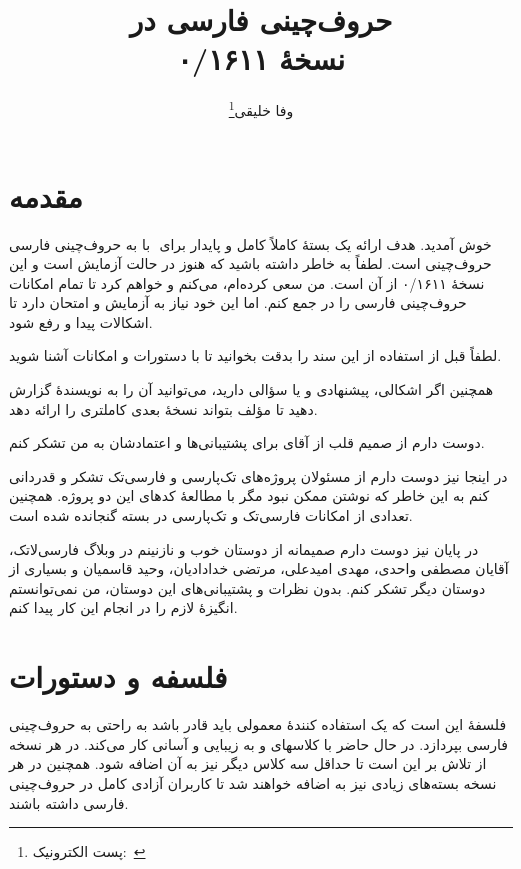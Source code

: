 \documentclass{report}
\title{حروف‌چینی فارسی در \eng{\XePersian}\\[0.2cm]نسخهٔ ۰/۱۶۱۱}
\author{وفا خلیقی\thanks{پست الکترونیک:~\eng{vafa.khalighi@students.mq.edu.au}}}
\begin{document}
\maths
\begin{farsi}
\maketitle
\tableofcontents
\chapter{مقدمه}
به حروف‌چینی فارسی ‪ ‬با ‪\eng{\XePersian} ‬خوش آمدید. هدف \eng{\XePersian} ارائه یک بستهٔ کاملاً کامل و پایدار برای حروف‌چینی است. لطفاً به خاطر داشته باشید که \eng{\XePersian} هنوز در حالت آزمایش است و این نسخهٔ ۰/۱۶۱۱ از آن است. من سعی کرده‌ام، می‌کنم و خواهم کرد تا تمام امکانات حروف‌چینی فارسی را در \eng{\XePersian} جمع کنم. اما این خود نیاز به آزمایش و امتحان دارد تا اشکالات پیدا و رفع شود.

لطفاً قبل از استفاده از \eng{\XePersian} این سند را بدقت بخوانید تا با دستورات و امکانات \eng{\XePersian} آشنا شوید.

همچنین اگر اشکالی، پیشنهادی و یا سؤالی دارید، می‌توانید آن را به نویسندهٔ \eng{\XePersian} گزارش دهید تا مؤلف \eng{\XePersian} بتواند نسخهٔ بعدی کاملتری را ارائه دهد.

دوست دارم از صمیم قلب از آقای  برای پشتیبانی‌ها و اعتمادشان به من تشکر کنم.

در اینجا نیز دوست دارم از مسئولان پروژه‌های تک‌پارسی و فارسی‌تک تشکر و قدردانی کنم به این خاطر که نوشتن \eng{\XePersian} ممکن نبود مگر با مطالعهٔ کدهای این دو پروژه. همچنین تعدادی از امکانات فارسی‌تک و  تک‌پارسی در بسته گنجانده شده است.

در پایان نیز دوست دارم صمیمانه از دوستان خوب و نازنینم در وبلاگ فارسی‌لاتک، آقایان مصطفی واحدی، مهدی امیدعلی، مرتضی خدادادیان، وحید قاسمیان و بسیاری از دوستان دیگر تشکر کنم. بدون نظرات و پشتیبانی‌های این دوستان، من نمی‌توانستم انگیزهٔ لازم را در انجام این کار پیدا کنم.
\chapter{فلسفه و دستورات}
فلسفهٔ \eng{\XePersian} این است که یک استفاده کنندهٔ معمولی باید قادر باشد به راحتی به حروف‌چینی فارسی بپردازد. در حال حاضر \eng{\XePersian} با کلاسهای  و  به زیبایی و آسانی کار می‌کند. در هر نسخه از \eng{\XePersian} تلاش بر این است تا حداقل سه کلاس دیگر نیز به آن اضافه شود. همچنین در هر نسخه بسته‌های زیادی نیز به \eng{\XePersian} اضافه خواهند شد تا کاربران آزادی کامل در حروف‌چینی فارسی داشته باشند.


\end{farsi}
\end{document}
